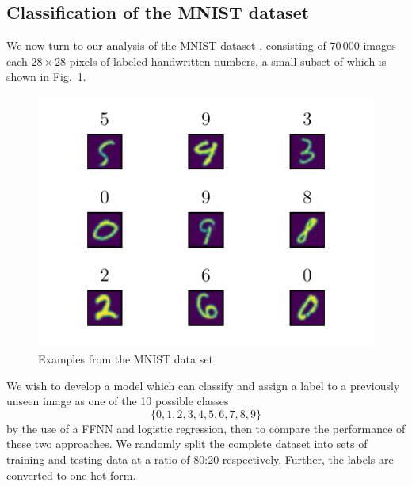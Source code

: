 \documentclass[reprint, english, nofootinbib]{revtex4-2}
\begin{document}
\subsection{Classification of the MNIST dataset}
\noindent
We now turn to our analysis of the MNIST dataset \cite{lecun2010mnist}, consisting of $70\,000$ images each $28\times28$ pixels of labeled handwritten numbers, a small subset of which is shown in Fig.~\ref{fig: MNIST example}.
\begin{figure}[h!tb]
    \center
    \includegraphics[width=.75\columnwidth]{MNIST_example.pdf}
    \caption{\label{fig: MNIST example}Examples from the MNIST data set}
\end{figure}
We wish to develop a model which can classify and assign a label to a previously unseen image as one of the 10 possible classes
\begin{equation*}
    \{0, 1, 2, 3, 4, 5, 6, 7, 8, 9\}
\end{equation*}
by the use of a FFNN and logistic regression, then to compare the performance of these two approaches. We randomly split the complete dataset into sets of training and testing data at a ratio of 80:20 respectively. Further, the labels are converted to one-hot form.
\end{document}
